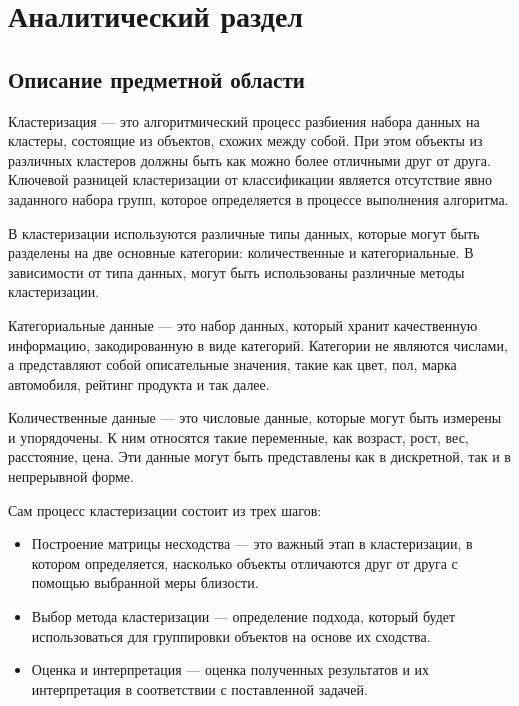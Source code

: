 \chapter{Аналитический раздел}






\section{Описание предметной области}

Кластеризация \cite{Clustering} --- это алгоритмический процесс разбиения набора данных на кластеры, состоящие из объектов, схожих между собой. При этом объекты из различных кластеров должны быть как можно более отличными друг от друга. Ключевой разницей кластеризации от классификации является отсутствие явно заданного набора групп, которое определяется в процессе выполнения алгоритма.

В кластеризации используются различные типы данных, которые могут быть разделены на две основные категории: количественные и категориальные. В зависимости от типа данных, могут быть использованы различные методы кластеризации.

Категориальные данные \cite{DataAnalysis} --- это набор данных, который хранит качественную информацию, закодированную в виде категорий. Категории не являются числами, а представляют собой описательные значения, такие как цвет, пол, марка автомобиля, рейтинг продукта и так далее.

Количественные данные \cite{DataAnalysis} --- это числовые данные, которые могут быть измерены и упорядочены. К ним относятся такие переменные, как возраст, рост, вес, расстояние, цена. Эти данные могут быть представлены как в дискретной, так и в непрерывной форме.

Сам процесс кластеризации состоит из трех шагов:

\begin{itemize}
    \item Построение матрицы несходства --- это важный этап в кластеризации, в котором определяется, насколько объекты отличаются друг от друга с помощью выбранной меры близости. 
    \item Выбор метода кластеризации --- определение подхода, который будет использоваться для группировки объектов на основе их сходства.
    \item Оценка и интерпретация --- оценка полученных результатов и их интерпретация в соответствии с поставленной задачей.
\end{itemize}

